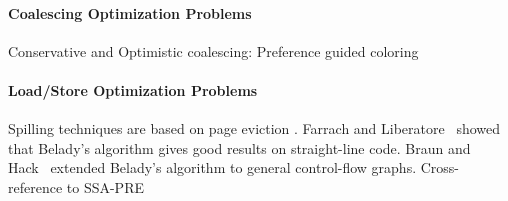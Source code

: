 {\paragraph{Coalescing Optimization Problems}
Conservative and Optimistic coalescing: \cite{Bouchez:case08}
Preference guided coloring~\cite{braun2010preference}

\paragraph{Load/Store Optimization Problems}
Spilling techniques are based on page eviction \cite{belady:1966:storage}.
Farrach and Liberatore~\cite{farach:98:local} showed that Belady's algorithm gives good results on straight-line code.
Braun and Hack~\cite{Braun:2009:CC} extended Belady's algorithm to general control-flow graphs.
\cite{YannakakisGavril87}
\cite{Bouchez07b}
Cross-reference to SSA-PRE

\endofchapter
}


